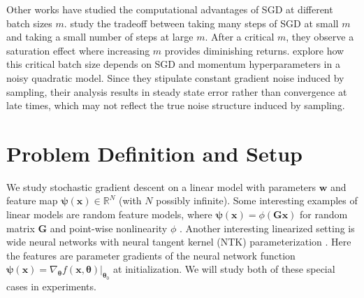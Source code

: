 \documentclass{article} %
\def\x{\bm x}
\def\w{\bm w}
\def\x{\mathbf x}
\def\w{\mathbf w}
\begin{document}

Other works have studied the computational advantages of SGD at different batch sizes $m$. \citet{ma_batch_size} study the tradeoff between taking many steps of SGD at small $m$ and taking a small number of steps at large $m$. After a critical $m$, they observe a saturation effect where increasing $m$ provides diminishing returns. \citet{zhang2019algorithmic} explore how this critical batch size depends on SGD and momentum hyperparameters in a noisy quadratic model. Since they stipulate constant gradient noise induced by sampling, their analysis results in steady state error rather than convergence at late times, which may not reflect the true noise structure induced by sampling.   %





\section{Problem Definition and Setup}

We study stochastic gradient descent on a linear model with parameters $\w$ and feature map $\bm\psi(\x) \in \mathbb{R}^N$ (with $N$ possibly infinite). Some interesting examples of linear models are random feature models, where $\bm\psi(\x) = \phi(\bm G \x)$ for random matrix $\bm G$ and point-wise nonlinearity $\phi$ \citep{Rahimi_Recht, mei2020generalization}. Another interesting linearized setting is wide neural networks with neural tangent kernel (NTK) parameterization \citep{jacot2020kernel, Lee_2020}. Here the features are parameter gradients of the neural network function $\bm\psi(\x) = \nabla_{\bm\theta} f(\x,\bm\theta)|_{\bm\theta_0}$ at initialization. We will study both of these special cases in experiments. 
\end{document}
